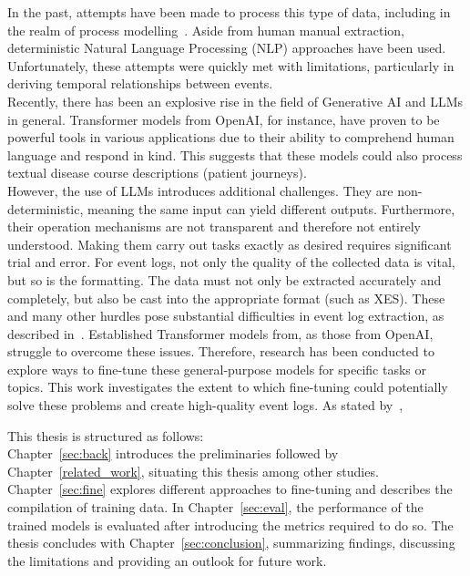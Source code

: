 In the past, attempts have been made to process this type of data, including in the realm of process modelling~\cite{friedrich_process_2011}. Aside from  human manual extraction,  deterministic Natural Language Processing (NLP) approaches have been used. Unfortunately, these attempts were quickly met with limitations, particularly in deriving temporal relationships between events.\\
Recently, there has been an explosive rise in the field of Generative AI and LLMs in general. Transformer models from OpenAI, for instance, have proven to be powerful tools in various applications due to their ability to comprehend human language and respond in kind. This suggests that these models could also process textual disease course descriptions (patient journeys).\\
However, the use of LLMs introduces additional challenges. They are non-deterministic, meaning the same input can yield different outputs. Furthermore, their operation mechanisms are not transparent and therefore not entirely understood. Making them carry out tasks exactly as desired requires significant trial and error. For event logs, not only the quality of the collected data is vital, but so is the formatting. The data must not only be extracted accurately and completely, but also be cast into the appropriate format (such as XES).
These and many other hurdles pose substantial difficulties in event log extraction, as described in~\cite{munoz-gama_process_2022}. Established Transformer models from, as those from OpenAI, struggle to overcome these issues. Therefore, research has been conducted to explore ways to fine-tune these general-purpose models for specific tasks or topics. This work investigates the extent to which fine-tuning could potentially solve these problems and create high-quality event logs. As stated by~\cite{latif_fine-tuning_2024}, 
\begin{quote}
\end{quote}

This thesis is structured as follows:\\
Chapter~\ref{sec:back} introduces the preliminaries followed by Chapter~\ref{related_work}, situating this thesis among other studies. Chapter~\ref{sec:fine} explores different approaches to fine-tuning and describes the compilation of training data. In Chapter~\ref{sec:eval}, the performance of the trained models is evaluated after introducing the metrics required to do so. The thesis concludes with Chapter~\ref{sec:conclusion}, summarizing findings, discussing the limitations and providing an outlook for future work.


